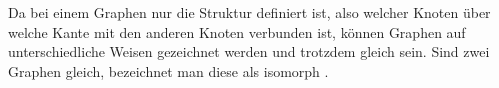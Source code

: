Da bei einem Graphen nur die Struktur definiert ist, also welcher Knoten über welche Kante mit den anderen Knoten verbunden ist, können Graphen auf unterschiedliche Weisen gezeichnet werden und trotzdem gleich sein.
Sind zwei Graphen gleich, bezeichnet man diese als isomorph \cite[Seite 22]{basicgraphtheory}.
%
%
